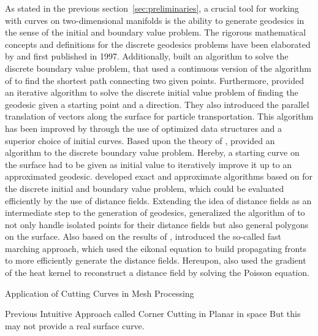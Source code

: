 \documentclass{stdlocal}
\begin{document}
  As stated in the previous section~\ref{sec:preliminaries}, a crucial tool for working with curves on two-dimensional manifolds is the ability to generate geodesics in the sense of the initial and boundary value problem.
  The rigorous mathematical concepts and definitions for the discrete geodesics problems have been elaborated by \textcite{mitchell1987} and \textcite{polthier2006} first published in 1997.
  Additionally, \textcite{mitchell1987} built an algorithm to solve the discrete boundary value problem, that used a continuous version of the algorithm of \textcite{dijkstra1959} to find the shortest path connecting two given points.
  Furthermore, \textcite{polthier2006} provided an iterative algorithm to solve the discrete initial value problem of finding the geodesic given a starting point and a direction.
  They also introduced the parallel translation of vectors along the surface for particle transportation.
  This algorithm has been improved by \textcite{mancinelli2022} through the use of optimized data structures and a superior choice of initial curves.
  Based upon the theory of \textcite{polthier2006}, \textcite{martinez2005} provided an algorithm to the discrete boundary value problem.
  Hereby, a starting curve on the surface had to be given as initial value to iteratively improve it up to an approximated geodesic.
  \textcite{surazhsky2005} developed exact and approximate algorithms based on \textcite{mitchell1987} for the discrete initial and boundary value problem, which could be evaluated efficiently by the use of distance fields.
  Extending the idea of distance fields as an intermediate step to the generation of geodesics, \textcite{bommes2007} generalized the algorithm of \textcite{surazhsky2005} to not only handle isolated points for their distance fields but also general polygons on the surface.
  Also based on the results of \textcite{mitchell1987}, \textcite{kimmel1996} introduced the so-called fast marching approach, which used the eikonal equation to build propagating fronts to more efficiently generate the distance fields.
  Hereupon, \textcite{crane2013} also used the gradient of the heat kernel to reconstruct a distance field by solving the Poisson equation.


  Application of Cutting Curves in Mesh Processing
  \autocite{zachow2003}
  \autocite{benhabiles2011}
  \autocite{ji2006}

  Previous Intuitive Approach called Corner Cutting in Planar
  \autocite{chaikin1974}
  \autocite{dyn1992}
  in space
  \autocite{morera2008}
  But this may not provide a real surface curve.
\end{document}
